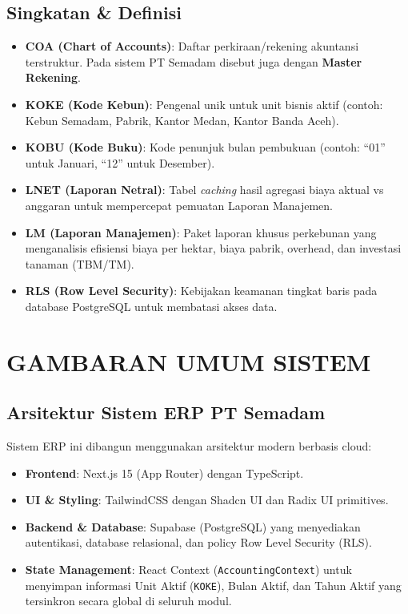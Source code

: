 \documentclass[11pt,a4paper]{article}
\begin{document}
\subsection{Singkatan \& Definisi}
\begin{itemize}
    \item \textbf{COA (Chart of Accounts)}: Daftar perkiraan/rekening akuntansi terstruktur. Pada sistem PT Semadam disebut juga dengan \textbf{Master Rekening}.
    \item \textbf{KOKE (Kode Kebun)}: Pengenal unik untuk unit bisnis aktif (contoh: Kebun Semadam, Pabrik, Kantor Medan, Kantor Banda Aceh).
    \item \textbf{KOBU (Kode Buku)}: Kode penunjuk bulan pembukuan (contoh: ``01'' untuk Januari, ``12'' untuk Desember).
    \item \textbf{LNET (Laporan Netral)}: Tabel \textit{caching} hasil agregasi biaya aktual vs anggaran untuk mempercepat pemuatan Laporan Manajemen.
    \item \textbf{LM (Laporan Manajemen)}: Paket laporan khusus perkebunan yang menganalisis efisiensi biaya per hektar, biaya pabrik, overhead, dan investasi tanaman (TBM/TM).
    \item \textbf{RLS (Row Level Security)}: Kebijakan keamanan tingkat baris pada database PostgreSQL untuk membatasi akses data.
\end{itemize}

\newpage

\section{GAMBARAN UMUM SISTEM}

\subsection{Arsitektur Sistem ERP PT Semadam}
Sistem ERP ini dibangun menggunakan arsitektur modern berbasis cloud:
\begin{itemize}
    \item \textbf{Frontend}: Next.js 15 (App Router) dengan TypeScript.
    \item \textbf{UI \& Styling}: TailwindCSS dengan Shadcn UI dan Radix UI primitives.
    \item \textbf{Backend \& Database}: Supabase (PostgreSQL) yang menyediakan autentikasi, database relasional, dan policy Row Level Security (RLS).
    \item \textbf{State Management}: React Context (\texttt{AccountingContext}) untuk menyimpan informasi Unit Aktif (\texttt{KOKE}), Bulan Aktif, dan Tahun Aktif yang tersinkron secara global di seluruh modul.
\end{itemize}
\end{document}
